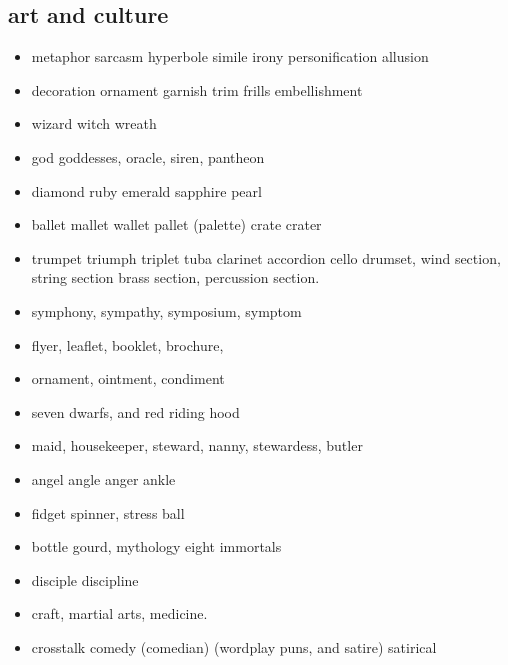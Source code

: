 \documentclass[a4paper,11pt,twoside]{book}
\begin{document}
\subsection{art and culture}
\begin{itemize}
	\item metaphor sarcasm hyperbole simile irony personification allusion 
	
	\item decoration ornament garnish trim frills embellishment
	
	\item wizard witch wreath 	
	
	\item god goddesses, oracle, siren, pantheon
	
	\item diamond ruby emerald sapphire pearl
	
	\item ballet mallet wallet pallet (palette) crate crater
	
	\item trumpet triumph triplet tuba clarinet accordion cello drumset, wind section, string section brass section, percussion section. 
	
	\item symphony, sympathy, symposium, symptom
	
	
	\item flyer, leaflet, booklet, brochure,
	
	\item ornament, ointment, condiment
	
	\item seven dwarfs, and red riding hood
	
	
	\item maid, housekeeper, steward, nanny, stewardess, butler
	
	\item angel angle anger ankle
	
	\item fidget spinner, stress ball
	
	\item bottle gourd, mythology eight immortals 
	
	\item disciple discipline
	
	\item craft, martial arts, medicine. 
	
	\item crosstalk comedy (comedian) (wordplay puns, and satire) satirical 
	

\end{itemize}
\end{document}
